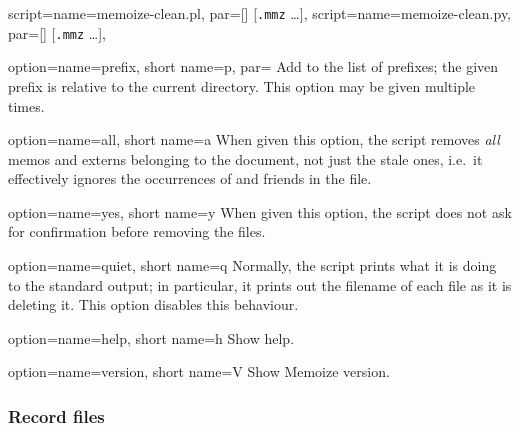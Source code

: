 \documentclass[a4paper,11pt]{article}
\begin{document}
\begin{doc}{
    script={name=memoize-clean.pl, par=[] [\texttt{.mmz} \dots]},
    script={name=memoize-clean.py, par=[] [\texttt{.mmz} \dots]},
  }
  \begin{doc}{
      option={name=prefix, short name=p, par=}
    }
    Add  to the list of prefixes; the given prefix is
    relative to the current directory.  This option may be given multiple
    times.
  \end{doc}
  \begin{doc}{
      option={name=all, short name=a}
    }
    When given this option, the script removes \emph{all} memos and externs
    belonging to the document, not just the stale ones, i.e.\ it effectively
    ignores the occurrences of  and friends in the \dmmz
    file.
  \end{doc}
  \begin{doc}{
      option={name=yes, short name=y}
    }
    When given this option, the script does not ask for confirmation before
    removing the files.
  \end{doc}
  \begin{doc}{
      option={name=quiet, short name=q}
    }
    Normally, the script prints what it is doing to the standard output; in
    particular, it prints out the filename of each file as it is deleting it.
    This option disables this behaviour.
  \end{doc}
  \begin{doc}{
      option={name=help, short name=h}
    }
    Show help.
  \end{doc}
  \begin{doc}{
      option={name=version, short name=V}
    }
    Show Memoize version.
  \end{doc}
\end{doc}

\subsubsection{Record files}
\label{sec:ref:record-files}
\end{document}
